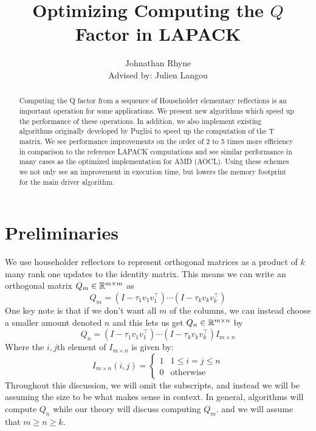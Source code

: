 \documentclass[12pt]{article}
\title{Optimizing Computing the $Q$ Factor in LAPACK}
\author{Johnathan Rhyne\\ Advised by: Julien Langou}
\begin{document}
    \maketitle
    \begin{abstract}
    Computing the Q factor from a sequence of Householder elementary reflections is an important operation for some 
    applications. We present new algorithms which speed up the performance of these operations. In addition, we also 
    implement existing algorithms originally developed by Puglisi to speed up the computation of the T matrix. We see 
    performance improvements on the order of 2 to 5 times more efficiency in comparison to the reference LAPACK 
    computations and see similar performance in many cases as the optimized implementation for AMD (AOCL). Using these 
    schemes we not only see an improvement in execution time, but lowers the memory footprint for the main driver 
    algorithm.
    \end{abstract}
    \section{Preliminaries}
    We use householder reflectors to represent orthogonal matrices as a product of $k$ many rank one updates to the identity matrix. This means we can write an orthogonal matrix $Q_m\in\mathbb{R}^{m\times m}$ as 
    \begin{equation}\label{eq:Q}
        Q_m = \left(I - \tau_1 v_1v_1^\top\right)\cdots\left(I - \tau_kv_kv_k^\top\right)
    \end{equation}
    One key note is that if we don't want all $m$ of the columns, we can instead choose a smaller amount denoted $n$ 
    and this lets us get $Q_n\in\mathbb{R}^{m\times n}$ by 
    \begin{equation}\label{eq:Qn}
        Q_n = \left(I - \tau_1 v_1v_1^\top\right)\cdots\left(I - \tau_kv_kv_k^\top\right)I_{m\times n}
    \end{equation}
    Where the $i,j$th element of $I_{m\times n}$ is given by:
    \begin{equation*}
        I_{m\times n}(i,j) = \begin{cases}
            1 & 1\leq i = j\leq n\\
            0 & \text{otherwise}
        \end{cases}
    \end{equation*}
    Throughout this discussion, we will omit the subscripts, and instead we will be assuming the size to be 
    what makes sense in context. In general, algorithms will compute $Q_n$ while our theory will discuss computing $Q_m$. 
    and we will assume that $m\geq n\geq k$.
\end{document}
